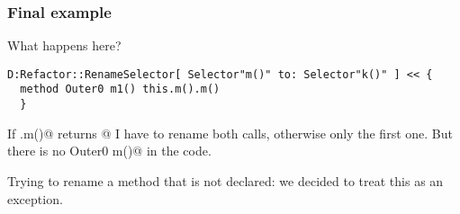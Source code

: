 \begin{frame}[fragile]
\frametitle{Final example}
What happens here?
\begin{NiceCode}{59ex}{0.8}
\begin{lstlisting}
D:Refactor::RenameSelector[ Selector"m()" to: Selector"k()" ] << {
  method Outer0 m1() this.m().m()
  }
\end{lstlisting}
\end{NiceCode}

If \Q@this.m()@ returns @ I have to rename both calls,
otherwise only the first one.
But there is no \Q@method Outer0 m()@
in the code.

Trying to rename a method that is not declared:
we decided to treat this as an exception.

\end{frame}



